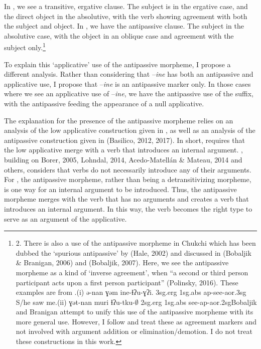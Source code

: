 \documentclass[output=paper,modfonts,nonflat]{langsci/langscibook}
\begin{document}
In , we see a transitive, ergative clause.  The subject is in the ergative case, and the direct object in the absolutive, with the verb showing agreement with both the subject and object.  In , we have the antipassive clause.  The subject in the absolutive case, with the object in an oblique case and agreement with the subject only.\footnote{2. There is also a use of the antipassive morpheme in Chukchi which has been dubbed the ‘spurious antipassive’ by (Hale, 2002) and discussed in (Bobaljik \& Branigan, 2006) and (Bobaljik, 2007).  Here, we see the antipassive morpheme as a kind of ‘inverse agreement’, when “a second or third person participant acts upon a first person participant” (Polinsky, 2016).  These examples are from \citet{Polinsky2016}.(i)  ə-nan     ɣəm     ine-ɬʔu-ɣʔi.   3\textrm{sg.erg} 1\textrm{sg.abs}     \textrm{ap}{}-see-\textrm{aor}.3\textrm{sg}   S/he saw me.(ii)    ɣət-nan   muri     ɬʔu-tku-\textrm{${\emptyset}$}    2\textrm{sg}.\textrm{erg}  1\textrm{sg.abs} see-\textrm{ap-aor}.2\textrm{sg}Bobaljik and Branigan attempt to unify this use of the antipassive morpheme with its more general use.  However, I follow \citet{Polinsky2016} and treat these as agreement markers and not involved with argument addition or elimination/demotion.  I do not treat these constructions in this work.} 

To explain this ‘applicative’ use of the antipassive morpheme, I propose a different analysis.  Rather than considering that –\textit{ine} has both an antipassive and applicative use, I propose that –\textit{ine} is an antipassive marker only. In those cases where we see an applicative use of –\textit{ine}, we have the antipassive use of the suffix, with the antipassive feeding the appearance of a null applicative.

The explanation for the presence of the antipassive morpheme relies on an analysis of the low applicative construction given in \citet{Pylkkänen2008}, as well as an analysis of the antipassive construction given in (Basilico, 2012, 2017).  In short, \citet{Pyllkänen2008} requires that the low applicative merge with a verb that introduces an internal argument.  \citet{Basilico2017}, building on Borer, 2005, Lohndal, 2014, Acedo-Matellán \& Mateau, 2014 and others, considers that verbs do not necessarily introduce any of their arguments.  For \citet{Basilico2017}, the antipassive morpheme, rather than being a detransitivizing morpheme, is one way for an internal argument to be introduced.  Thus, the antipassive morpheme merges with the verb that has no arguments and creates a verb that introduces an internal argument. In this way, the verb becomes the right type to serve as an argument of the applicative.
\end{document}
